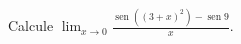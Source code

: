 \item Calcule $\displaystyle \lim_{x \to 0} \frac{\operatorname{sen}((3 + x)^2) - \operatorname{sen} 9}{x}$.
